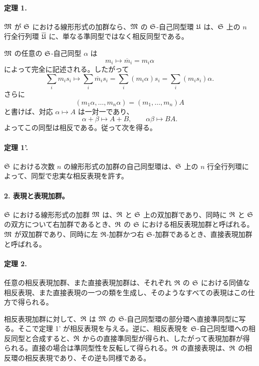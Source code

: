 \paragraph{定理 1.}
\(\mathfrak M\) が \(\mathfrak S\) における線形形式の加群なら、\(\mathfrak M\) の \(\mathfrak S\)-自己同型環 \(\mathfrak U\) は、\(\mathfrak S\) 上の \(n\) 行全行列環 \(\overline{\mathfrak U}\) に、単なる準同型ではなく相反同型である。

\(\mathfrak M\) の任意の \(\mathfrak S\)-自己同型 \(\alpha\) は
\[
        m_i\longmapsto \overline m_i=m_i\alpha
\]
によって完全に記述される。したがって
\[
        \sum_i m_i s_i\longmapsto
        \sum_i \overline m_i s_i
        =\sum_i (m_i\alpha)s_i
        =\sum_i (m_i s_i)\alpha.
\]
さらに
\[
        (m_1\alpha,\ldots,m_n\alpha)=(m_1,\ldots,m_n)A
\]
と書けば、対応 \(\alpha\mapsto A\) は一対一であり、
\[
        \alpha+\beta\mapsto A+B,
        \qquad
        \alpha\beta\mapsto BA.
\]
よってこの同型は相反である。従って次を得る。

\paragraph{定理 1'.}
\(\mathfrak S\) における次数 \(n\) の線形形式の加群の自己同型環は、\(\mathfrak S\) 上の \(n\) 行全行列環によって、同型で忠実な相反表現を許す。

\paragraph{2. 表現と表現加群。}
\(\mathfrak S\) における線形形式の加群 \(\mathfrak M\) は、\(\mathfrak R\) と \(\mathfrak S\) 上の双加群であり、同時に \(\mathfrak R\) と \(\mathfrak S\) の双方について右加群であるとき、\(\mathfrak R\) の \(\mathfrak S\) における相反表現加群と呼ばれる。\(\mathfrak M\) が双加群であり、同時に左 \(\mathfrak R\)-加群かつ右 \(\mathfrak S\)-加群であるとき、直接表現加群と呼ばれる。

\paragraph{定理 2.}
任意の相反表現加群、また直接表現加群は、それぞれ \(\mathfrak R\) の \(\mathfrak S\) における同値な相反表現、また直接表現の一つの類を生成し、そのようなすべての表現はこの仕方で得られる。

相反表現加群に対して、\(\mathfrak R\) は \(\mathfrak M\) の \(\mathfrak S\)-自己同型環の部分環へ直接準同型に写る。そこで定理 1' が相反表現を与える。逆に、相反表現を \(\mathfrak S\)-自己同型環への相反同型と合成すると、\(\mathfrak R\) からの直接準同型が得られ、したがって表現加群が得られる。直接の場合は準同型性を反転して得られる。\(\mathfrak R\) の直接表現は、\(\mathfrak R\) の相反環の相反表現であり、その逆も同様である。

